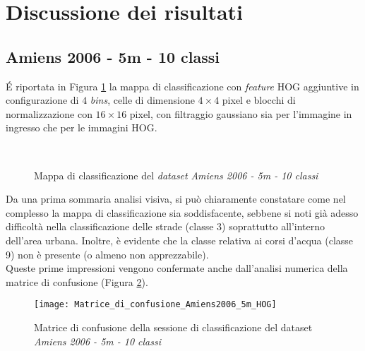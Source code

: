 \clearpage
\section{Discussione dei risultati}
\subsection{Amiens 2006 - 5m - 10 classi}
\'E riportata in Figura \ref{fig:ClassMap_Amiens2006_5m} la mappa di classificazione con \emph{feature} HOG aggiuntive in configurazione di $4$ \emph{bins}, celle di dimensione $4\times4$ pixel e blocchi di normalizzazione con $16\times16$ pixel, con filtraggio gaussiano sia per l'immagine in ingresso che per le immagini HOG.
\begin{figure}[!ht]
 \center
      \\
     
    \caption{Mappa di classificazione del \emph{dataset} \emph{Amiens 2006 - 5m - 10 classi}}
    \label{fig:ClassMap_Amiens2006_5m}
  \end{figure} 
 
Da una prima sommaria analisi visiva, si può chiaramente constatare come nel complesso la mappa di classificazione sia soddisfacente, sebbene si noti già adesso difficoltà nella classificazione delle strade (classe 3) soprattutto all'interno dell'area urbana. Inoltre, è evidente che la classe relativa ai corsi d'acqua (classe 9) non è presente (o almeno non apprezzabile).\\

Queste prime impressioni vengono confermate anche dall'analisi numerica della matrice di confusione (Figura \ref{fig:Matrice_di_confusione_Amiens2006_5m_HOG}). 
\begin{figure}[!ht]
    \texttt{[image: Matrice\_di\_confusione\_Amiens2006\_5m\_HOG]}
    \caption{Matrice di confusione della sessione di classificazione del dataset \emph{Amiens 2006 - 5m - 10 classi}}
    \label{fig:Matrice_di_confusione_Amiens2006_5m_HOG}
\end{figure}

